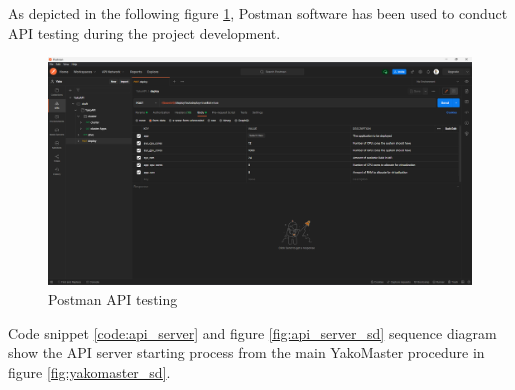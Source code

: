             As depicted in the following figure \ref{fig:postman}, Postman software has been used to conduct API testing during the project development.
            
            \begin{figure}[H]
                \centering
                \includegraphics[width=\linewidth]{Images/Backend/Postman.png}
                \caption{Postman API testing}
                \label{fig:postman}
            \end{figure}
            
            
            Code snippet \ref{code:api_server} and figure \ref{fig:api_server_sd} sequence diagram show the API server starting process from the main YakoMaster procedure in figure \ref{fig:yakomaster_sd}.

